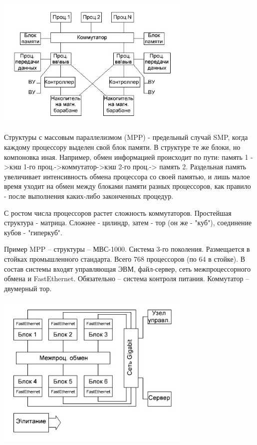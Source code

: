\documentclass[unicode, 12pt, a4paper, oneside]{article}
\begin{document}
\begin{center}
\includegraphics[width=0.7\textwidth]{118_Elbrus.png}
\end{center}
Структуры с массовым параллелизмом (MPP) - предельный случай SMP, когда каждому процессору выделен свой блок памяти. В структуре те же блоки, но компоновка иная. Например, обмен информацией происходит по пути: память 1 ->кэш 1-го проц.->коммутатор->кэш 2-го проц.-> память 2. Раздельная память увеличивает интенсивность обмена процессора со своей памятью, и лишь малое время уходит на обмен между блоками памяти разных процессоров, как правило - после выполнения каких-либо законченных процедур.

С ростом числа процессоров растет сложность коммутаторов. Простейшая структура - матрица. Сложнее - цилиндр, затем - тор (он же - "куб"), соединение кубов - "гиперкуб".

Пример MPP – структуры – МВС-1000. Система 3-го поколения. Размещается в стойках промышленного стандарта. Всего 768 процессоров (по 64 в стойке). В состав системы входят управляющая ЭВМ, файл-сервер, сеть межпроцессорного обмена и FastEthernet. Обязательно – система контроля питания. Коммутатор – двумерный тор.

\begin{center}
\includegraphics[width=0.7\textwidth]{118_MBC-1000.png}
\end{center}
\end{document}
